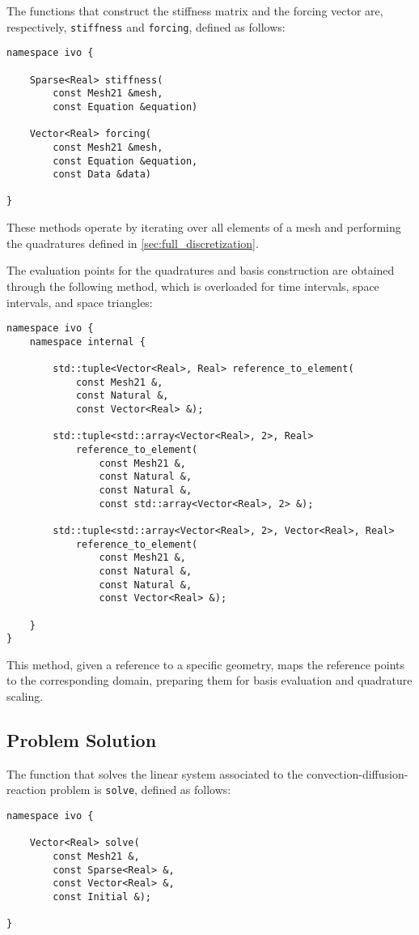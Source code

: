 The functions that construct the stiffness matrix and the forcing vector are, respectively, \lstinline{stiffness} and \lstinline{forcing}, defined as follows:
\begin{lstlisting}[style=cpp]
namespace ivo {

    Sparse<Real> stiffness(
        const Mesh21 &mesh, 
        const Equation &equation)

    Vector<Real> forcing(
        const Mesh21 &mesh, 
        const Equation &equation, 
        const Data &data)

}
\end{lstlisting}
These methods operate by iterating over all elements of a mesh and performing the quadratures defined in \cref{sec:full_discretization}.

The evaluation points for the quadratures and basis construction are obtained through the following method, which is overloaded for time intervals, space intervals, and space triangles:
\begin{lstlisting}[style=cpp]
namespace ivo {
    namespace internal {

        std::tuple<Vector<Real>, Real> reference_to_element(
            const Mesh21 &, 
            const Natural &, 
            const Vector<Real> &);

        std::tuple<std::array<Vector<Real>, 2>, Real> 
            reference_to_element(
                const Mesh21 &, 
                const Natural &, 
                const Natural &, 
                const std::array<Vector<Real>, 2> &);

        std::tuple<std::array<Vector<Real>, 2>, Vector<Real>, Real> 
            reference_to_element(
                const Mesh21 &, 
                const Natural &, 
                const Natural &, 
                const Vector<Real> &);

    }
}
\end{lstlisting}
This method, given a reference to a specific geometry, maps the reference points to the corresponding domain, preparing them for basis evaluation and quadrature scaling.

\newpage
\subsection{Problem Solution}

The function that solves the linear system associated to the convection-diffusion-reaction problem is \lstinline{solve}, defined as follows:
\begin{lstlisting}[style=cpp]
namespace ivo {

    Vector<Real> solve(
        const Mesh21 &, 
        const Sparse<Real> &, 
        const Vector<Real> &, 
        const Initial &);

}
\end{lstlisting}

